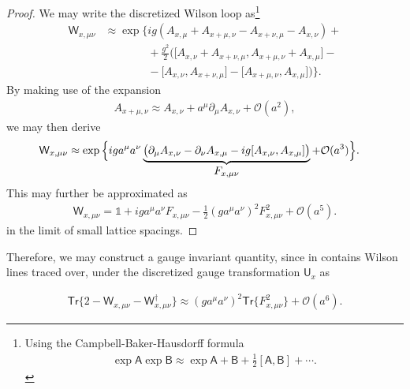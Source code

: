 \begin{proof}
We may write the discretized Wilson loop as\footnote{
Using the Campbell-Baker-Hausdorff formula
\begin{align*}
    \exp{\textsf{A}}\exp{\textsf{B}}\approx\exp{\textsf{A}+\textsf{B}+\frac{1}{2}[\textsf{A}, \textsf{B}]+\cdots}.
\end{align*}
}
\begin{align*}
    \textsf{W}_{x,\mu\nu}&\approx\exp\Bigg\{ig(A_{x,\mu}+A_{x+\mu,\nu}-A_{x+\nu,\mu}-A_{x,\nu})+\\
    &\phantom{\approx\exp\Bigg\{}+\frac{g^2}{2}\Big(\big[A_{x,\nu}+A_{x+\nu,\mu},A_{x+\mu,\nu}+A_{x,\mu}\big]-\\
    &\phantom{\approx\exp\Bigg\{}-\big[A_{x,\nu},A_{x+\nu,\mu}\big]-\big[A_{x+\mu,\nu},A_{x,\mu}\big]\Big)\Bigg\}.
\end{align*}
By making use of the expansion 
\begin{align*}
    A_{x+\mu,\nu}\approx A_{x,\nu}+a^\mu\partial_\mu A_{x,\nu}+\mathcal{O}(a^2),   
\end{align*}
we may then derive
\begin{align*}
     \textsf{W}_{x,\mu\nu}&\approx\exp\Big\{iga^\mu a^\nu\underbrace{\big(\partial_\mu A_{x,\nu}-\partial_\nu A_{x,\mu}-ig[A_{x,\nu},A_{x,\mu}]\big)}_{\mathclap{\textstyle F_{x,\mu\nu}}}+\mathcal{O}(a^3)\Big\}.
\end{align*}
This may further be approximated as
\begin{align*}
    \textsf{W}_{x,\mu\nu}=\mathds{1}+ig a^\mu a^\nu F_{x,\mu \nu}-\frac{1}{2}(ga^\mu a^\nu)^2 F_{x,\mu \nu}^2+\mathcal{O}(a^5).
\end{align*}
in the limit of small lattice spacings.
\end{proof}

Therefore, we may construct a gauge invariant quantity, since in contains Wilson lines traced over, under the discretized gauge transformation $\textsf{U}_x$ as

\begin{align}\label{latt7}
    \textsf{Tr}\big\{2-\textsf{W}_{x, \mu \nu}-\textsf{W}_{x, \mu \nu}^{\dagger}\big\} \approx\left(g a^{\mu} a^{\nu}\right)^{2} \textsf{Tr}\big\{F_{x,\mu \nu}^{2}\big\}+\mathcal{O}(a^{6}).
\end{align}

